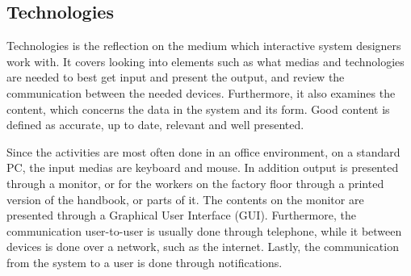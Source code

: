 \subsection{Technologies}
Technologies is the reflection on the medium which interactive system designers work with.
It covers looking into elements such as what medias and technologies are needed to best get input and present the output, and review the communication between the needed devices.
Furthermore, it also examines the content, which concerns the data in the system and its form.
Good content is defined as accurate, up to date, relevant and well presented.

Since the activities are most often done in an office environment, on a standard PC, the input medias are keyboard and mouse.
In addition output is presented through a monitor, or for the workers on the factory floor through a printed version of the handbook, or parts of it.
The contents on the monitor are presented through a Graphical User Interface (GUI).
Furthermore, the communication user-to-user is usually done through telephone, while it between devices is done over a network, such as the internet.
Lastly, the communication from the system to a user is done through notifications.

